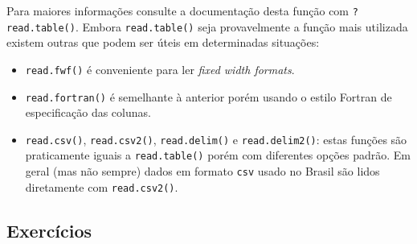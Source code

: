 \documentclass[
  10pt,
  a4paper]{book}
\providecommand{\tightlist}{%
  \setlength{\itemsep}{0pt}\setlength{\parskip}{0pt}}
\begin{document}
Para maiores informações consulte a documentação desta função com
\texttt{?read.table()}. Embora \texttt{read.table()} seja provavelmente a função mais
utilizada existem outras que podem ser úteis em determinadas situações:

\begin{itemize}
\tightlist
\item
  \texttt{read.fwf()} é conveniente para ler \emph{fixed width formats}.
\item
  \texttt{read.fortran()} é semelhante à anterior porém usando o estilo Fortran
  de especificação das colunas.
\item
  \texttt{read.csv()}, \texttt{read.csv2()}, \texttt{read.delim()} e \texttt{read.delim2()}: estas
  funções são praticamente iguais a \texttt{read.table()} porém com diferentes
  opções padrão. Em geral (mas não sempre) dados em formato \texttt{csv} usado
  no Brasil são lidos diretamente com \texttt{read.csv2()}.
\end{itemize}

\hypertarget{exercuxedcios-10}{%
\subsection*{Exercícios}\label{exercuxedcios-10}}
\end{document}
